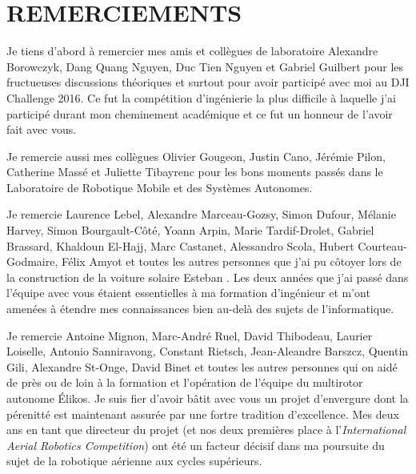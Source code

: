 %
\chapter*{REMERCIEMENTS}\thispagestyle{headings}
%

Je tiens d'abord à remercier mes amis et collègues de laboratoire Alexandre Borowczyk, Dang Quang Nguyen, Duc Tien Nguyen et Gabriel Guilbert pour les fructueuses discussions théoriques et surtout pour avoir participé avec moi au DJI Challenge 2016. Ce fut la compétition d'ingénierie la plus difficile à laquelle j'ai participé durant mon cheminement académique et ce fut un honneur de l'avoir fait avec vous.

Je remercie aussi mes collègues Olivier Gougeon, Justin Cano, Jérémie Pilon, Catherine Massé et Juliette Tibayrenc pour les bons moments passés dans le Laboratoire de Robotique Mobile et des Systèmes Autonomes.

\newcommand{\RNum}[1]{\uppercase\expandafter{\romannumeral #1\relax}}

Je remercie Laurence Lebel, Alexandre Marceau-Gozsy, Simon Dufour, Mélanie Harvey, Simon Bourgault-Côté, Yoann Arpin, Marie Tardif-Drolet, Gabriel Brassard, Khaldoun El-Hajj, Marc Castanet, Alessandro Scola, Hubert Courteau-Godmaire, Félix Amyot et toutes les autres personnes que j'ai pu côtoyer lors de la construction de la voiture solaire Esteban \RNum{6}. Les deux années que j'ai passé dans l'équipe avec vous étaient essentielles à ma formation d'ingénieur et m'ont amenées à étendre mes connaissances bien au-delà des sujets de l'informatique.

Je remercie Antoine Mignon, Marc-André Ruel, David Thibodeau, Laurier Loiselle, Antonio Sanniravong, Constant Rietsch, Jean-Aleandre Barszcz, Quentin Gili, Alexandre St-Onge, David Binet et toutes les autres personnes qui on aidé de près ou de loin à la formation et l'opération de l'équipe du multirotor autonome Élikos. Je suis fier d'avoir bâtit avec vous un projet d'envergure dont la pérenitté est maintenant assurée par une fortre tradition d'excellence. Mes deux ans en tant que directeur du projet (et nos deux premières place à l'\emph{International Aerial Robotics Competition}) ont été un facteur décisif dans ma poursuite du sujet de la robotique aérienne aux cycles supérieurs.

